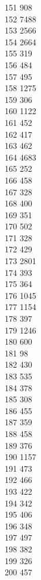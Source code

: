 { 151	908 \\
 152	7488 \\
 153	2566 \\
 154	2664 \\
 155	319 \\
 156	484 \\
 157	495 \\
 158	1275 \\
 159	306 \\
 160	1122 \\
 161	452 \\
 162	417 \\
 163	462 \\
 164	4683 \\
 165	252 \\
 166	458 \\
 167	328 \\
 168	400 \\
 169	351 \\
 170	502 \\
 171	328 \\
 172	429 \\
 173	2801 \\
 174	393 \\
 175	364 \\
 176	1045 \\
 177	1154 \\
 178	397 \\
 179	1246 \\
 180	600 \\
 181	98 \\
 182	430 \\
 183	535 \\
 184	378 \\
 185	308 \\
 186	455 \\
 187	359 \\
 188	458 \\
 189	376 \\
 190	1157 \\
 191	473 \\
 192	466 \\
 193	422 \\
 194	342 \\
 195	406 \\
 196	348 \\
 197	497 \\
 198	382 \\
 199	326 \\
 200	457 \\
}
